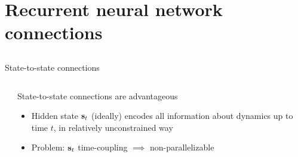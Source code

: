 \section{Recurrent neural network connections}
\subsection{}

\begin{frame}{State-to-state connections}
    \begin{columns}
        \begin{column}{0.602\textwidth}
            
        \end{column}

        \begin{column}{0.398\textwidth}
            \begin{block}{}
                State-to-state connections are advantageous
            \end{block}

            \begin{itemize}
                \item Hidden state $\mathbf{s}_t$ (ideally) encodes all information about dynamics up to time $t$, in relatively unconstrained way
                \item Problem: $\mathbf{s}_t$ time-coupling $\implies$ non-parallelizable
            \end{itemize}
        \end{column}
    \end{columns}
\end{frame}

